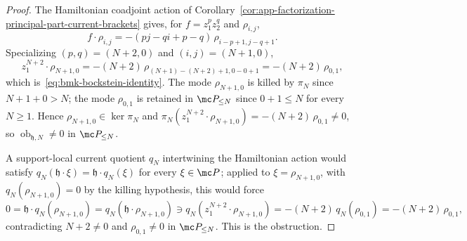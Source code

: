 \begin{proof}
  The Hamiltonian coadjoint action of
  Corollary~\ref{cor:app-factorization-principal-part-current-brackets}
  gives, for \(f=z_1^pz_2^q\) and \(\rho_{i,j}\),
  \[
    f\cdot\rho_{i,j}=-(pj-qi+p-q)\,\rho_{i-p+1,j-q+1}.
  \]
  Specializing \((p,q)=(N+2,0)\) and \((i,j)=(N+1,0)\),
  \[
    z_1^{N+2}\cdot\rho_{N+1,0}=-(N+2)\,\rho_{(N+1)-(N+2)+1,0-0+1}
      =-(N+2)\,\rho_{0,1},
  \]
  which is~\eqref{eq:bmk-bockstein-identity}.  The mode
  \(\rho_{N+1,0}\) is killed by \(\pi_N\) since \(N+1+0>N\); the mode
  \(\rho_{0,1}\) is retained in \(\mc P_{\leq N}\) since \(0+1\leq N\)
  for every \(N\geq1\).  Hence
  \(\rho_{N+1,0}\in\ker\pi_N\) and
  \(\pi_N(z_1^{N+2}\cdot\rho_{N+1,0})=-(N+2)\,\rho_{0,1}\neq 0\), so
  \(\operatorname{ob}_{\mathfrak h,N}\neq 0\) in \(\mc P_{\leq N}\).

  A support-local current quotient \(q_N\) intertwining the
  Hamiltonian action would satisfy
  \(q_N(\mathfrak h\cdot\xi)=\mathfrak h\cdot q_N(\xi)\) for every
  \(\xi\in\mc P\); applied to \(\xi=\rho_{N+1,0}\), with
  \(q_N(\rho_{N+1,0})=0\) by the killing hypothesis, this would force
  \[
    0=\mathfrak h\cdot q_N(\rho_{N+1,0})
      =q_N(\mathfrak h\cdot\rho_{N+1,0})
      \ni q_N(z_1^{N+2}\cdot\rho_{N+1,0})
      =-(N+2)\,q_N(\rho_{0,1})
      =-(N+2)\,\rho_{0,1},
  \]
  contradicting \(N+2\neq 0\) and \(\rho_{0,1}\neq 0\) in
  \(\mc P_{\leq N}\).  This is the obstruction.


\end{proof}
